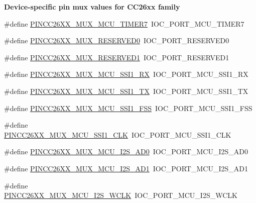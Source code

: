 \begin{Indent}{\bf Device-\/specific pin mux values for C\-C26xx family}
\begin{DoxyCompactItemize}
\item 
\#define \hyperlink{_p_i_n_c_c26_x_x_8h_a5cd4fd779c61244915aef4d6d436866b}{P\-I\-N\-C\-C26\-X\-X\-\_\-\-M\-U\-X\-\_\-\-M\-C\-U\-\_\-\-T\-I\-M\-E\-R7}~I\-O\-C\-\_\-\-P\-O\-R\-T\-\_\-\-M\-C\-U\-\_\-\-T\-I\-M\-E\-R7
\item 
\#define \hyperlink{_p_i_n_c_c26_x_x_8h_af96d092f498cb7a2550b17d9dc20c9bd}{P\-I\-N\-C\-C26\-X\-X\-\_\-\-M\-U\-X\-\_\-\-R\-E\-S\-E\-R\-V\-E\-D0}~I\-O\-C\-\_\-\-P\-O\-R\-T\-\_\-\-R\-E\-S\-E\-R\-V\-E\-D0
\item 
\#define \hyperlink{_p_i_n_c_c26_x_x_8h_ad0b60558170f22cce2aa6b5a9021fb60}{P\-I\-N\-C\-C26\-X\-X\-\_\-\-M\-U\-X\-\_\-\-R\-E\-S\-E\-R\-V\-E\-D1}~I\-O\-C\-\_\-\-P\-O\-R\-T\-\_\-\-R\-E\-S\-E\-R\-V\-E\-D1
\item 
\#define \hyperlink{_p_i_n_c_c26_x_x_8h_ac3d873c9fc963e7abdd88ac92a2efb97}{P\-I\-N\-C\-C26\-X\-X\-\_\-\-M\-U\-X\-\_\-\-M\-C\-U\-\_\-\-S\-S\-I1\-\_\-\-R\-X}~I\-O\-C\-\_\-\-P\-O\-R\-T\-\_\-\-M\-C\-U\-\_\-\-S\-S\-I1\-\_\-\-R\-X
\item 
\#define \hyperlink{_p_i_n_c_c26_x_x_8h_a6843ba0b056b1b2a7ee3b6471da4e6a1}{P\-I\-N\-C\-C26\-X\-X\-\_\-\-M\-U\-X\-\_\-\-M\-C\-U\-\_\-\-S\-S\-I1\-\_\-\-T\-X}~I\-O\-C\-\_\-\-P\-O\-R\-T\-\_\-\-M\-C\-U\-\_\-\-S\-S\-I1\-\_\-\-T\-X
\item 
\#define \hyperlink{_p_i_n_c_c26_x_x_8h_aef46bbee91ef9b7786e7ff242ebc9383}{P\-I\-N\-C\-C26\-X\-X\-\_\-\-M\-U\-X\-\_\-\-M\-C\-U\-\_\-\-S\-S\-I1\-\_\-\-F\-S\-S}~I\-O\-C\-\_\-\-P\-O\-R\-T\-\_\-\-M\-C\-U\-\_\-\-S\-S\-I1\-\_\-\-F\-S\-S
\item 
\#define \hyperlink{_p_i_n_c_c26_x_x_8h_a9625d595a8b69fa6e5405741818e1bda}{P\-I\-N\-C\-C26\-X\-X\-\_\-\-M\-U\-X\-\_\-\-M\-C\-U\-\_\-\-S\-S\-I1\-\_\-\-C\-L\-K}~I\-O\-C\-\_\-\-P\-O\-R\-T\-\_\-\-M\-C\-U\-\_\-\-S\-S\-I1\-\_\-\-C\-L\-K
\item 
\#define \hyperlink{_p_i_n_c_c26_x_x_8h_ab4fda137377a46f157d7d1ec55339dc7}{P\-I\-N\-C\-C26\-X\-X\-\_\-\-M\-U\-X\-\_\-\-M\-C\-U\-\_\-\-I2\-S\-\_\-\-A\-D0}~I\-O\-C\-\_\-\-P\-O\-R\-T\-\_\-\-M\-C\-U\-\_\-\-I2\-S\-\_\-\-A\-D0
\item 
\#define \hyperlink{_p_i_n_c_c26_x_x_8h_a3d04198ab5bfdd7a50d113833bf64bc9}{P\-I\-N\-C\-C26\-X\-X\-\_\-\-M\-U\-X\-\_\-\-M\-C\-U\-\_\-\-I2\-S\-\_\-\-A\-D1}~I\-O\-C\-\_\-\-P\-O\-R\-T\-\_\-\-M\-C\-U\-\_\-\-I2\-S\-\_\-\-A\-D1
\item 
\#define \hyperlink{_p_i_n_c_c26_x_x_8h_ab79ff812095158eced35716d506be08e}{P\-I\-N\-C\-C26\-X\-X\-\_\-\-M\-U\-X\-\_\-\-M\-C\-U\-\_\-\-I2\-S\-\_\-\-W\-C\-L\-K}~I\-O\-C\-\_\-\-P\-O\-R\-T\-\_\-\-M\-C\-U\-\_\-\-I2\-S\-\_\-\-W\-C\-L\-K

\end{DoxyCompactItemize}
\end{Indent}
